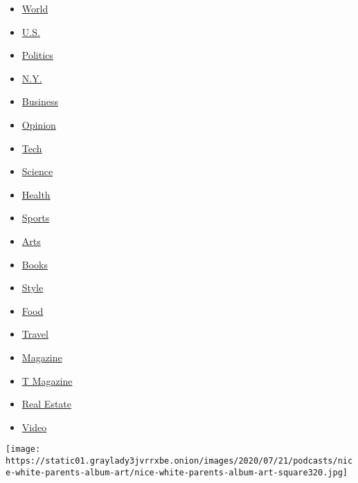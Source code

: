 \begin{itemize}
\tightlist
\item
  \href{https://www.nytimes3xbfgragh.onion/section/world}{World}
\item
  \href{https://www.nytimes3xbfgragh.onion/section/us}{U.S.}
\item
  \href{https://www.nytimes3xbfgragh.onion/section/politics}{Politics}
\item
  \href{https://www.nytimes3xbfgragh.onion/section/nyregion}{N.Y.}
\item
  \href{https://www.nytimes3xbfgragh.onion/section/business}{Business}
\item
  \href{https://www.nytimes3xbfgragh.onion/section/opinion}{Opinion}
\item
  \href{https://www.nytimes3xbfgragh.onion/section/technology}{Tech}
\item
  \href{https://www.nytimes3xbfgragh.onion/section/science}{Science}
\item
  \href{https://www.nytimes3xbfgragh.onion/section/health}{Health}
\item
  \href{https://www.nytimes3xbfgragh.onion/section/sports}{Sports}
\item
  \href{https://www.nytimes3xbfgragh.onion/section/arts}{Arts}
\item
  \href{https://www.nytimes3xbfgragh.onion/section/books}{Books}
\item
  \href{https://www.nytimes3xbfgragh.onion/section/style}{Style}
\item
  \href{https://www.nytimes3xbfgragh.onion/section/food}{Food}
\item
  \href{https://www.nytimes3xbfgragh.onion/section/travel}{Travel}
\item
  \href{https://www.nytimes3xbfgragh.onion/section/magazine}{Magazine}
\item
  \href{https://www.nytimes3xbfgragh.onion/section/t-magazine}{T
  Magazine}
\item
  \href{https://www.nytimes3xbfgragh.onion/section/realestate}{Real
  Estate}
\item
  \href{https://www.nytimes3xbfgragh.onion/video}{Video}
\end{itemize}

\href{/2020/07/30/podcasts/nice-white-parents-serial.html}{}

\texttt{[image: https://static01.graylady3jvrrxbe.onion/images/2020/07/21/podcasts/nice-white-parents-album-art/nice-white-parents-album-art-square320.jpg]}

